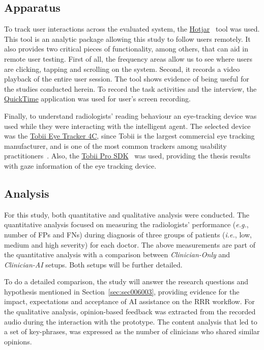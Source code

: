 \subsection{Apparatus}
\label{sec:sec006005002}

To track user interactions across the evaluated system, the \hyperlink{https://www.hotjar.com/}{Hotjar}~\cite{liikkanen2017data} tool was used.
This tool is an analytic package allowing this study to follow users remotely.
It also provides two critical pieces of functionality, among others, that can aid in remote user testing.
First of all, the frequency areas allow us to see where users are clicking, tapping and scrolling on the system.
Second, it records a video playback of the entire user session.
The tool shows evidence of being useful for the studies conducted herein.
To record the task activities and the interview, the \hyperlink{https://support.apple.com/downloads/quicktime}{QuickTime} application was used for user's screen recording.

Finally, to understand radiologists' reading behaviour an eye-tracking device was used while they were interacting with the intelligent agent.
The selected device was the \hyperlink{https://gaming.tobii.com/product/tobii-eye-tracker-4c/}{Tobii Eye Tracker 4C}, since Tobii is the largest commercial eye tracking manufacturer, and is one of the most common trackers among usability practitioners~\cite{sidenko2018eye}.
Also, the \hyperlink{https://www.tobiipro.com/product-listing/tobii-pro-sdk/}{Tobii Pro SDK}~\cite{chatelain2018evaluation} was used, providing the thesis results with gaze information of the eye tracking device.

\subsection{Analysis}
\label{sec:sec006005003}

For this study, both quantitative and qualitative analysis were conducted.
The quantitative analysis focused on measuring the radiologists' performance ({\it e.g.}, number of \acp{FP} and \acp{FN}) during diagnosis of three groups of patients ({\it i.e.}, low, medium and high severity) for each doctor.
The above measurements are part of the quantitative analysis with a comparison between {\it Clinician-Only} and {\it Clinician-AI} setups.
Both setups will be further detailed.

To do a detailed comparison, the study will answer the research questions and hypothesis mentioned in Section~\ref{sec:sec006003}, providing evidence for the impact, expectations and acceptance of \ac{AI} assistance on the \ac{RRR} workflow.
For the qualitative analysis, opinion-based feedback was extracted from the recorded audio during the interaction with the prototype.
The content analysis that led to a set of key-phrases, was expressed as the number of clinicians who shared similar opinions.


